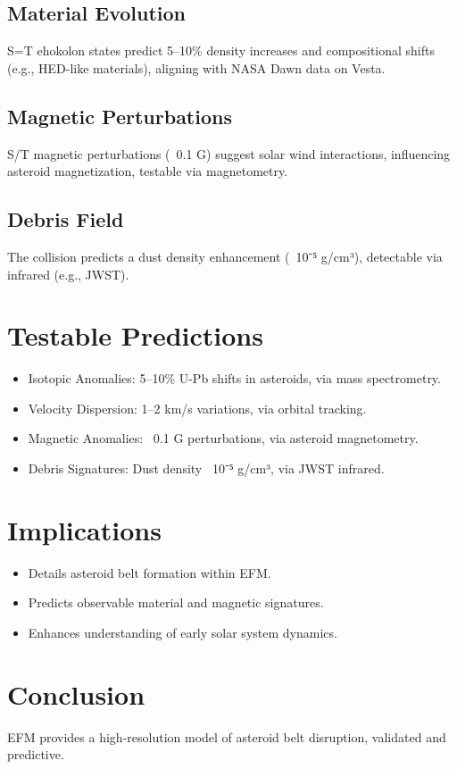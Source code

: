 \documentclass[11pt]{article}
\begin{document}
\subsection{Material Evolution}
S=T ehokolon states predict 5--10\% density increases and compositional shifts (e.g., HED-like materials), aligning with NASA Dawn data on Vesta.

\subsection{Magnetic Perturbations}
S/T magnetic perturbations (~0.1 G) suggest solar wind interactions, influencing asteroid magnetization, testable via magnetometry.

\subsection{Debris Field}
The collision predicts a dust density enhancement (~10⁻⁵ g/cm³), detectable via infrared (e.g., JWST).

\section{Testable Predictions}
\begin{itemize}
    \item Isotopic Anomalies: 5--10\% U-Pb shifts in asteroids, via mass spectrometry.
    \item Velocity Dispersion: 1--2 km/s variations, via orbital tracking.
    \item Magnetic Anomalies: ~0.1 G perturbations, via asteroid magnetometry.
    \item Debris Signatures: Dust density ~10⁻⁵ g/cm³, via JWST infrared.
\end{itemize}

\section{Implications}
\begin{itemize}
    \item Details asteroid belt formation within EFM.
    \item Predicts observable material and magnetic signatures.
    \item Enhances understanding of early solar system dynamics.
\end{itemize}

\section{Conclusion}
EFM provides a high-resolution model of asteroid belt disruption, validated and predictive.
\end{document}
